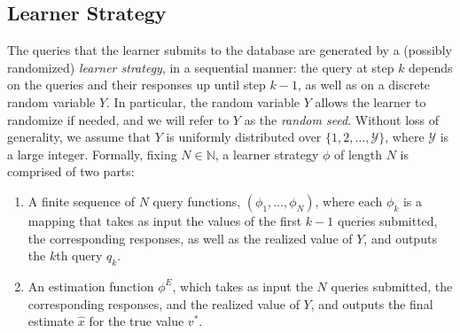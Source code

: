 \documentclass[final,12pt]{colt2018}
\def\red#1{{\color{red} #1}}
\def\tr#1{\red{[Comments: #1 ]}}
\begin{document}
\subsection{{Learner} Strategy} 
\label{sec:user_strategy}
The queries that the {learner} submits to the database are generated by a (possibly randomized) \emph{{learner} strategy}, in a sequential manner: the query at step $k$ depends on the queries and their responses up until step $k-1$, as well as {on} a discrete random variable $Y$. In particular, the random variable $Y$ allows the {learner} to randomize if needed, and we will refer to $Y$ as the \emph{random seed}. Without loss of generality, we assume that $Y$ is uniformly distributed {over} $\{1,2,\dots,\mathcal{Y}\}$, where $\mathcal{Y}$ is a large integer. Formally, fixing $N\in\mathbb{N}$,
a {learner} strategy $\phi$ of length $N$ is comprised of two parts: 
\begin{enumerate}
 	\item A finite sequence of $N$ query functions, $(\phi_1, \dots, \phi_N)$, where each $\phi_k$ is a mapping that takes as input the values of the first $k-1$ queries submitted, the corresponding responses, as well as the realized value of $Y$, and outputs the $k$th query $q_k$.
 	\item An estimation function $\phi^{E}$, which takes as input the $N$ queries submitted, the corresponding responses, and the realized value of $Y$, and outputs the final estimate ${\hat{x}}$ for the true value $v^*$. 
 \end{enumerate} 

%
\end{document}
